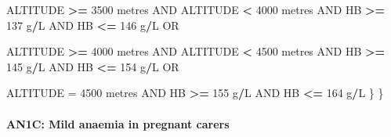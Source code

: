 \documentclass[12pt,a4paper]{article}
\newenvironment{Shaded}{\begin{snugshade}}{\end{snugshade}}
\newcommand{\DecValTok}[1]{\textcolor[rgb]{0.00,0.00,0.81}{#1}}
\newcommand{\NormalTok}[1]{#1}
\newcommand{\OperatorTok}[1]{\textcolor[rgb]{0.81,0.36,0.00}{\textbf{#1}}}
\newcommand{\StringTok}[1]{\textcolor[rgb]{0.31,0.60,0.02}{#1}}
\let\oldparagraph\paragraph
\renewcommand{\paragraph}[1]{\oldparagraph{#1}\mbox{}}
\begin{document}
\begin{Shaded}
\begin{Highlighting}[]
\NormalTok{        ALTITUDE }\OperatorTok{>=}\StringTok{ }\DecValTok{3500}\NormalTok{ metres AND ALTITUDE }\OperatorTok{<}\StringTok{ }\DecValTok{4000}\NormalTok{ metres AND }
\NormalTok{          HB }\OperatorTok{>=}\StringTok{ }\DecValTok{137}\NormalTok{ g}\OperatorTok{/}\NormalTok{L AND HB }\OperatorTok{<=}\StringTok{ }\DecValTok{146}\NormalTok{ g}\OperatorTok{/}\NormalTok{L OR}
    
\NormalTok{        ALTITUDE }\OperatorTok{>=}\StringTok{ }\DecValTok{4000}\NormalTok{ metres AND ALTITUDE }\OperatorTok{<}\StringTok{ }\DecValTok{4500}\NormalTok{ metres AND }
\NormalTok{          HB }\OperatorTok{>=}\StringTok{ }\DecValTok{145}\NormalTok{ g}\OperatorTok{/}\NormalTok{L AND HB }\OperatorTok{<=}\StringTok{ }\DecValTok{154}\NormalTok{ g}\OperatorTok{/}\NormalTok{L OR}
    
\NormalTok{        ALTITUDE =}\StringTok{ }\DecValTok{4500}\NormalTok{ metres AND HB }\OperatorTok{>=}\StringTok{ }\DecValTok{155}\NormalTok{ g}\OperatorTok{/}\NormalTok{L AND HB }\OperatorTok{<=}\StringTok{ }\DecValTok{164}\NormalTok{ g}\OperatorTok{/}\NormalTok{L}
\NormalTok{      \}}
\NormalTok{  \}}
\end{Highlighting}
\end{Shaded}

\newpage

\hypertarget{an1c-mild-anaemia-in-pregnant-carers}{%
\paragraph{AN1C: Mild anaemia in pregnant carers}\label{an1c-mild-anaemia-in-pregnant-carers}}
\end{document}
